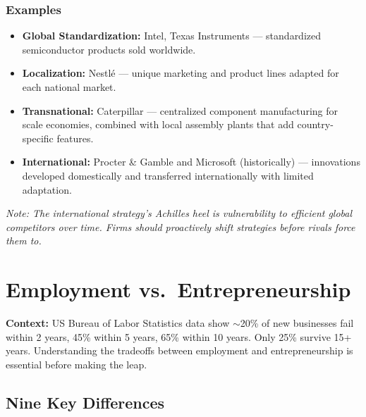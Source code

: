 \documentclass[11pt, letterpaper]{article}
\begin{document}
\subsubsection{Examples}
\begin{itemize}[leftmargin=*]
  \item \textbf{Global Standardization:} Intel, Texas Instruments --- standardized semiconductor products sold worldwide.
  \item \textbf{Localization:} Nestlé --- unique marketing and product lines adapted for each national market.
  \item \textbf{Transnational:} Caterpillar --- centralized component manufacturing for scale economies, combined with local assembly plants that add country-specific features.
  \item \textbf{International:} Procter \& Gamble and Microsoft (historically) --- innovations developed domestically and transferred internationally with limited adaptation.
\end{itemize}

\textit{Note: The international strategy's Achilles heel is vulnerability to efficient global competitors over time. Firms should proactively shift strategies before rivals force them to.}

\newpage

\section{Employment vs.\ Entrepreneurship}

\begin{defbox}
\textbf{Context:} US Bureau of Labor Statistics data show $\sim$20\% of new businesses fail within 2 years, 45\% within 5 years, 65\% within 10 years. Only 25\% survive 15+ years. Understanding the tradeoffs between employment and entrepreneurship is essential before making the leap.
\end{defbox}

\subsection{Nine Key Differences}
\end{document}
